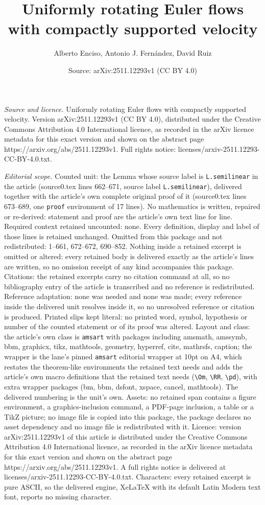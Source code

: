 \documentclass[10pt,a4paper]{amsart}
\title[Uniformly rotating Euler flows with compactly supported velo]{Uniformly rotating Euler flows with compactly supported velocity}
\author{Alberto Enciso, Antonio J. Fern\'andez, David Ruiz}
\date{Source: arXiv:2511.12293v1 (CC BY 4.0)}
\begin{document}
\maketitle

\noindent\emph{Source and licence.} Uniformly rotating Euler flows with compactly supported velocity. Version arXiv:2511.12293v1 (CC BY 4.0), distributed under the Creative Commons Attribution 4.0 International licence, as recorded in the arXiv licence metadata for this exact version and shown on the abstract page https://arxiv.org/abs/2511.12293v1. Full rights notice: licenses/arxiv-2511.12293-CC-BY-4.0.txt.\par\smallskip

\noindent\textit{Editorial scope.} Counted unit: the Lemma whose source label is \texttt{L.semilinear} in the article (source0.tex lines 662--671, source label \texttt{L.semilinear}), delivered together with the article's own complete original proof of it (source0.tex lines 673--689, one \texttt{proof} environment of 17 lines). No mathematics is written, repaired or re-derived: statement and proof are the article's own text line for line. Required context retained uncounted: none. Every definition, display and label of those lines is retained unchanged. Omitted from this package and not redistributed: 1--661, 672--672, 690--852. Nothing inside a retained excerpt is omitted or altered: every retained body is delivered exactly as the article's lines are written, so no omission receipt of any kind accompanies this package. Citations: the retained excerpts carry no citation command at all, so no bibliography entry of the article is transcribed and no reference is redistributed. Reference adaptation: none was needed and none was made; every reference inside the delivered unit resolves inside it, so no unresolved reference or citation is produced. Printed slips kept literal: no printed word, symbol, hypothesis or number of the counted statement or of its proof was altered. Layout and class: the article's own class is \texttt{amsart} with packages including amsmath, amssymb, bbm, graphicx, tikz, mathtools, geometry, hyperref, cite, mathrsfs, caption; the wrapper is the lane's pinned \texttt{amsart} editorial wrapper at 10pt on A4, which restates the theorem-like environments the retained text needs and adds the article's own macro definitions that the retained text needs (\texttt{\textbackslash Om}, \texttt{\textbackslash RR}, \texttt{\textbackslash pd}), with extra wrapper packages (bm, bbm, dsfont, xspace, cancel, mathtools). The delivered numbering is the unit's own. Assets: no retained span contains a figure environment, a graphics-inclusion command, a PDF-page inclusion, a table or a TikZ picture; no image file is copied into this package, the package declares no asset dependency and no image file is redistributed with it. Licence: version arXiv:2511.12293v1 of this article is distributed under the Creative Commons Attribution 4.0 International licence, as recorded in the arXiv licence metadata for this exact version and shown on the abstract page https://arxiv.org/abs/2511.12293v1. A full rights notice is delivered at licenses/arxiv-2511.12293-CC-BY-4.0.txt. Characters: every retained excerpt is pure ASCII, so the delivered engine, XeLaTeX with its default Latin Modern text font, reports no missing character.
\end{document}

